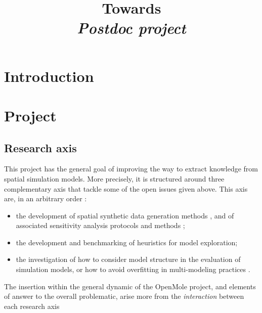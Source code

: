 


\title{Towards \bigskip\\
\textit{Postdoc project}
}
\author{}
\date{}


\maketitle

\justify





\section{Introduction}




\section{Project}


\subsection{Research axis}

This project has the general goal of improving the way to extract knowledge from spatial simulation models. More precisely, it is structured around three complementary axis that tackle some of the open issues given above. This axis are, in an arbitrary order :
\begin{itemize}
\item the development of spatial synthetic data generation methods \cite{raimbault2016generation}, and of associated sensitivity analysis protocols and methods \cite{cottineau2017initial};
\item the development and benchmarking of heuristics for model exploration;
\item the investigation of how to consider model structure in the evaluation of simulation models, or how to avoid overfitting in multi-modeling practices \cite{raimbault2017indirect}.
\end{itemize}

The insertion within the general dynamic of the OpenMole project, and elements of answer to the overall problematic, arise more from the \emph{interaction} between each research axis 



